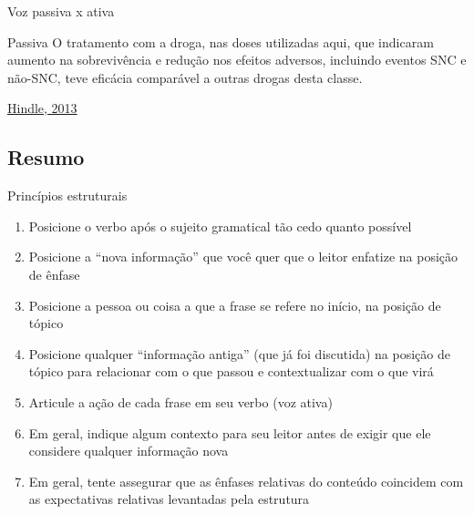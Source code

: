 \documentclass{beamer}
\begin{document}
\begin{frame}{Voz passiva x ativa}
  \begin{exampleblock}{Passiva}
    \scriptsize
    O tratamento com a droga, nas doses utilizadas aqui, que
    indicaram aumento na sobrevivência e redução nos efeitos adversos,
    incluindo eventos SNC e não-SNC, teve eficácia
    comparável a outras drogas desta classe.

  \end{exampleblock}

  \vfill
  \scriptsize
  \hfill \href{https://web.archive.org/web/20150321052033/http://www.edanzediting.com/blog/reader_expectations_active_voice}
  {Hindle, 2013}
\end{frame}

\subsection{Resumo}

\begin{frame}{Princípios estruturais}

  \begin{enumerate}
    \scriptsize
  \item Posicione o verbo \alert{após} o sujeito gramatical \alert{tão
      cedo quanto possível}
  \item Posicione a ``nova informação'' que você quer que o leitor
    enfatize na \alert{posição de ênfase}
  \item Posicione a pessoa ou coisa a que a frase se refere no início,
    na \alert{posição de tópico}
  \item Posicione qualquer ``informação antiga'' (que já foi
    discutida) na \alert{posição de tópico} para relacionar com o que
    passou e contextualizar com o que virá
  \item Articule a ação de cada frase em seu verbo (\alert{voz ativa})
  \item Em geral, indique algum contexto para seu leitor antes de
    exigir que ele considere qualquer informação nova
  \item Em geral, tente assegurar que as ênfases relativas do conteúdo
    coincidem com as expectativas relativas levantadas pela estrutura
  \end{enumerate}
\end{frame}
\end{document}
